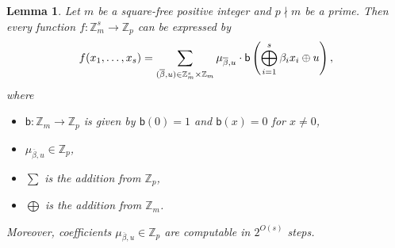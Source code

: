 \documentclass[11pt,a4paper]{amsart}
\newtheorem{lm}{Lemma}[section]
\newcommand{\m}[1]{{\uppercase {\bf{#1}}}}
\renewcommand{\o}[1]{\overline {#1}}
\newcommand{\map}{\longrightarrow}
\newcommand{\z}{\mathbb{Z}}
\renewcommand{\b}{\textsf{b}}
\begin{document}
\begin{lm}
\label{lm-zpqe}
Let $m$ be a square-free positive integer and $p\nmid m$ be a prime.
Then every function $f: \z_m^s \map \z_p$ can be expressed by
\[
f(x_1,\ldots,x_s)=\sum_{(\o\beta,u)\in\m \z_m^s\times\z_m}
\mu_{\o\beta,u}\cdot \b\left(\bigoplus_{i=1}^s \beta_i x_i\oplus u\right),
\]
where
\begin{itemize}
    \item $\b:\z_m\map\z_p$ is given by $\b(0)=1$ and $\b(x)=0$ for $x \neq 0$,
    \item $\mu_{\o\beta,u}\in \z_p$,
    \item $\sum$ is the addition from $\mathbb{Z}_p$,
    \item $\bigoplus$ is the addition from $\mathbb{Z}_m$.
\end{itemize}
Moreover, coefficients $\mu_{\o\beta,u}\in \z_p$ are computable in $2^{O(s)}$ steps.
\end{lm}
\end{document}
